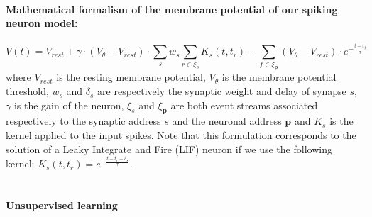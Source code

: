 \documentclass[11pt]{article}
\newcommand{\arank}{r} %
\newcommand{\synapticweight}{w} %
\newcommand{\synapticdelay}{\delta} %
\newcommand{\ranksyn}{s} %
\newcommand{\timev}{t} %
\newcommand{\eventstream}{\xi} %
\newcommand{\channel}{\mathbf{p}} %
\newcommand{\mempot}{V} %
\newcommand{\restpot}{V_{rest}} %
\newcommand{\threspot}{V_\theta} %
\newcommand{\gain}{\gamma} %
\newcommand{\kernel}{K} %
\newcommand{\firerank}{f}
\begin{document}
\paragraph*{Mathematical formalism of the membrane potential of our spiking neuron model:}
\begin{equation}
\mempot(\timev) = \restpot + \gain \cdot (\threspot-\restpot) \cdot \sum_{\ranksyn} \synapticweight_\ranksyn \sum_{\arank \in \eventstream_\ranksyn} \kernel_\ranksyn(\timev, t_\arank) - \sum_{\firerank \in \eventstream_\channel} (\threspot-\restpot) \cdot e^{-\frac{\timev - \timev_\firerank}{\tau}}
\label{eq:mem_pot}
\end{equation}
where $\restpot$ is the resting membrane potential, $\threspot$ is the membrane potential threshold, $\synapticweight_\ranksyn$ and $\synapticdelay_\ranksyn$ are respectively the synaptic weight and delay of synapse $\ranksyn$, $\gain$ is the gain of the neuron, $\eventstream_\ranksyn$ and $\eventstream_\channel$ are both event streams associated respectively to the synaptic address $\ranksyn$ and the neuronal address $\channel$ and $\kernel_\ranksyn$ is the kernel applied to the input spikes. Note that this formulation corresponds to the solution of a Leaky Integrate and Fire (LIF) neuron if we use the following kernel: $\kernel_\ranksyn(\timev, \timev_\arank) = e^{-\frac{ \timev-\timev_\arank-\synapticdelay_\ranksyn}{\tau}}$.\\
\\
\break
%
\vspace{-1.5cm}
\paragraph*{Unsupervised learning\\}
\end{document}
